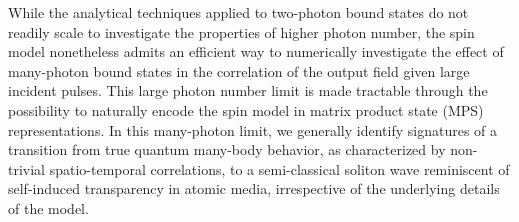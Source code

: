 \documentclass[pra,twocolumn,showpacs,preprintnumbers,amsmath,amssymb]{revtex4-1}
\begin{document}
While the analytical techniques applied to two-photon bound states do not readily scale to investigate the properties of higher photon number, the spin model nonetheless admits an efficient way to numerically investigate the effect of many-photon bound states in the correlation of the output field given large incident pulses. This large photon number limit is made tractable through the possibility to naturally encode the spin model in matrix product state (MPS) representations. In this many-photon limit, we generally identify signatures of a transition  from true quantum many-body behavior, as characterized by non-trivial spatio-temporal correlations, to a semi-classical soliton wave reminiscent of self-induced transparency in atomic media, irrespective of the underlying details of the model. 



\end{document}

